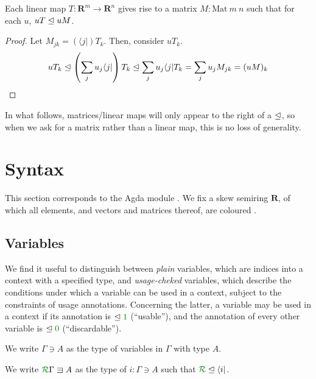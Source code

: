 \documentclass[submission,copyright,creativecommons]{eptcs}
\begin{document}
\begin{lemma}
  Each linear map $T : \mathbf R^m \to \mathbf R^n$ gives rise to a matrix
  $M : \mathrm{Mat}~m~n$ such that for each $u$, $uT \trianglelefteq uM$.
\end{lemma}
\begin{proof}
  Let $M_{jk} = (\langle j \rvert)T_k$.
  Then, consider $uT_k$.
  \[
    uT_k \trianglelefteq \left(\sum_j u_j\langle j \rvert\right)T_k
    \trianglelefteq \sum_j u_j\langle j \rvert T_k
    = \sum_j u_j M_{jk} = (uM)_k
  \]
\end{proof}

In what follows, matrices/linear maps will only appear to the right of a
$\trianglelefteq$, so when we ask for a matrix rather than a linear map, this is no loss
of generality.

\section{Syntax}\label{sec:syntax}

This section corresponds to the Agda module .
We fix a skew semiring $\mathbf R$, of which all elements, and vectors and
matrices thereof, are coloured .

\subsection{Variables}

We find it useful to distinguish between \emph{plain} variables, which are
indices into a context with a specified type, and \emph{usage-cheked} variables,
which describe the conditions under which a variable can be used in a context,
subject to the constraints of usage annotations.
Concerning the latter, a variable may be used in a context if its annotation is
$\subres \rescomment 1$ (``usable''), and the annotation of every other variable
is $\subres \rescomment 0$ (``discardable'').

\begin{definition}
  We write $\Gamma \ni A$ as the type of variables in $\Gamma$ with type $A$.
\end{definition}

\begin{definition}
  We write $\ctx{\Gamma}{R} \lvar A$ as the type of $i : \Gamma \ni A$ such that
  $\resctx R \subres \langle i \rvert$.
\end{definition}
\end{document}
